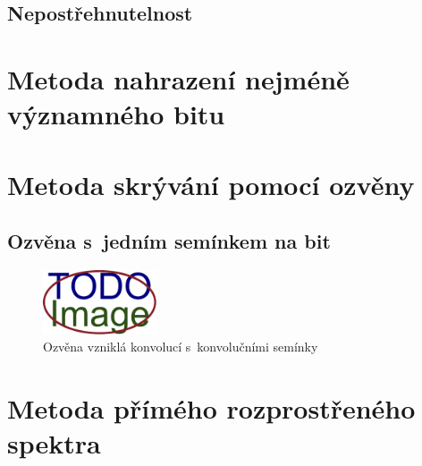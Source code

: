 \blindtext

\subsection*{Nepostřehnutelnost}
\label{sub:imperceptibility}

\blindtext

\section{Metoda nahrazení nejméně významného bitu}
\label{sec:lsb}


\blindtext

\blindtext

\blindtext

\section{Metoda skrývání pomocí ozvěny}
\label{sec:echo-hiding}


\blindtext

\blindtext

\subsection*{Ozvěna s~jedním semínkem na bit}
\label{sec:echo-single-kernel}


\blindtext

\begin{figure}[hbt]
    \centering
    \includegraphics[width=0.3\textwidth]{obrazky/placeholder.pdf}
    \caption{Ozvěna vzniklá konvolucí s~konvolučními semínky}
    \label{pic:echo-single-kernel-echo}
\end{figure}

\blindtext

\section{Metoda přímého rozprostřeného spektra}
\label{sec:dsss}

